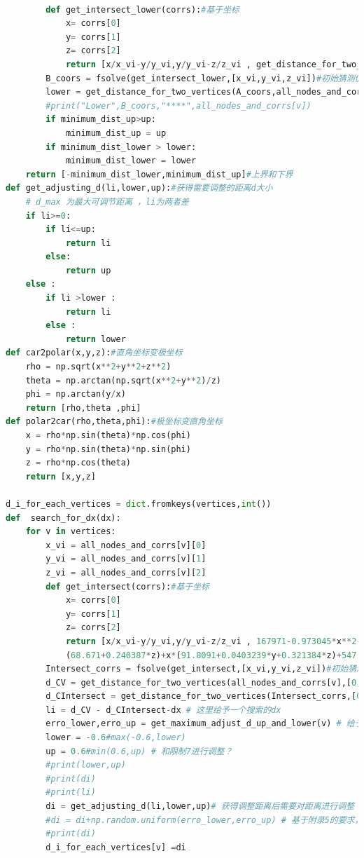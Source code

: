 \documentclass[withoutpreface,bwprint]{cumcmthesis} %
\begin{document}
\begin{appendices}
\begin{lstlisting}[language=python]
        
        def get_intersect_lower(corrs):#基于坐标
            x= corrs[0]
            y= corrs[1]
            z= corrs[2]
            return [x/x_vi-y/y_vi,y/y_vi-z/z_vi , get_distance_for_two_vertices([x,y,z],all_nodes_and_corrs[v_adjacent])-Wij*(1+0.0007)]
        B_coors = fsolve(get_intersect_lower,[x_vi,y_vi,z_vi])#初始猜测值[0,-1]
        lower = get_distance_for_two_vertices(A_coors,all_nodes_and_corrs[v])
        #print("Lower",B_coors,"****",all_nodes_and_corrs[v])
        if minimum_dist_up>up:
            minimum_dist_up = up
        if minimum_dist_lower > lower:
            minimum_dist_lower = lower 
    return [-minimum_dist_lower,minimum_dist_up]#上界和下界
def get_adjusting_d(li,lower,up):#获得需要调整的距离d大小
    # d_max 为最大可调节距离 ，li为两者差
    if li>=0:
        if li<=up:
            return li
        else:
            return up
    else :
        if li >lower :
            return li
        else :
            return lower 
def car2polar(x,y,z):#直角坐标变极坐标
    rho = np.sqrt(x**2+y**2+z**2)
    theta = np.arctan(np.sqrt(x**2+y**2)/z)
    phi = np.arctan(y/x)
    return [rho,theta ,phi]
def polar2car(rho,theta,phi):#极坐标变直角坐标
    x = rho*np.sin(theta)*np.cos(phi)
    y = rho*np.sin(theta)*np.sin(phi)
    z = rho*np.cos(theta)
    return [x,y,z]

d_i_for_each_vertices = dict.fromkeys(vertices,int())
def  search_for_dx(dx):
    for v in vertices:
        x_vi = all_nodes_and_corrs[v][0]
        y_vi = all_nodes_and_corrs[v][1]
        z_vi = all_nodes_and_corrs[v][2]
        def get_intersect(corrs):#基于坐标
            x= corrs[0]
            y= corrs[1]
            z= corrs[2]
            return [x/x_vi-y/y_vi,y/y_vi-z/z_vi , 167971-0.973045*x**2-0.984919*y**2+y*
            (68.671+0.240387*z)+x*(91.8091+0.0403239*y+0.321384*z)+547.321*z-0.0420355*z**2]
        Intersect_corrs = fsolve(get_intersect,[x_vi,y_vi,z_vi])#初始猜测值[0,-1]
        d_CV = get_distance_for_two_vertices(all_nodes_and_corrs[v],[0,0,0])
        d_CIntersect = get_distance_for_two_vertices(Intersect_corrs,[0,0,0])
        li = d_CV - d_CIntersect-dx # 这里给予一个搜索的dx 
        erro_lower,erro_up = get_maximum_adjust_d_up_and_lower(v) # 给予一个随机误差的范围
        lower = -0.6#max(-0.6,lower)
        up = 0.6#min(0.6,up) # 和限制7进行调整？
        #print(lower,up)
        #print(di)
        #print(li)
        di = get_adjusting_d(li,lower,up)# 获得调整距离后需要对距离进行调整
        #di = di+np.random.uniform(erro_lower,erro_up) # 基于附录5的要求，给予一个误差
        #print(di)
        d_i_for_each_vertices[v] =di 
        

\end{lstlisting}
\end{appendices}
\end{document}
